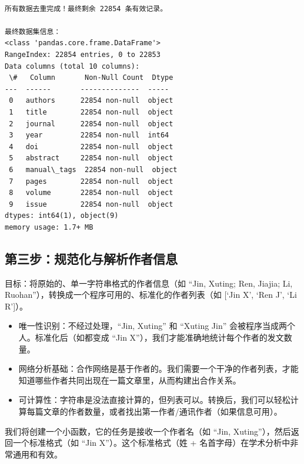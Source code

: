 \documentclass[11pt]{article}
\providecommand{\tightlist}{%
      \setlength{\itemsep}{0pt}\setlength{\parskip}{0pt}}
\begin{document}
    \begin{Verbatim}[commandchars=\\\{\}]

所有数据去重完成！最终剩余 22854 条有效记录。

最终数据集信息：
<class 'pandas.core.frame.DataFrame'>
RangeIndex: 22854 entries, 0 to 22853
Data columns (total 10 columns):
 \#   Column       Non-Null Count  Dtype
---  ------       --------------  -----
 0   authors      22854 non-null  object
 1   title        22854 non-null  object
 2   journal      22854 non-null  object
 3   year         22854 non-null  int64
 4   doi          22854 non-null  object
 5   abstract     22854 non-null  object
 6   manual\_tags  22854 non-null  object
 7   pages        22854 non-null  object
 8   volume       22854 non-null  object
 9   issue        22854 non-null  object
dtypes: int64(1), object(9)
memory usage: 1.7+ MB
    \end{Verbatim}

    \subsection{第三步：规范化与解析作者信息}\label{ux7b2cux4e09ux6b65ux89c4ux8303ux5316ux4e0eux89e3ux6790ux4f5cux8005ux4fe1ux606f}

    目标：将原始的、单一字符串格式的作者信息（如 ``Jin, Xuting; Ren, Jiajia;
Li, Ruohan''），转换成一个程序可用的、标准化的作者列表（如 {[}`Jin X',
`Ren J', `Li R'{]}）。

    \begin{itemize}
\tightlist
\item
  唯一性识别：不经过处理，``Jin, Xuting'' 和 ``Xuting Jin''
  会被程序当成两个人。标准化后（如都变成 ``Jin
  X''），我们才能准确地统计每个作者的发文数量。
\item
  网络分析基础：合作网络是基于作者的。我们需要一个干净的作者列表，才能知道哪些作者共同出现在一篇文章里，从而构建出合作关系。
\item
  可计算性：字符串是没法直接计算的，但列表可以。转换后，我们可以轻松计算每篇文章的作者数量，或者找出第一作者/通讯作者（如果信息可用）。
\end{itemize}

    我们将创建一个小函数，它的任务是接收一个作者名（如 ``Jin,
Xuting''），然后返回一个标准格式（如 ``Jin X''）。这个标准格式（姓 +
名首字母）在学术分析中非常通用和有效。
\end{document}
